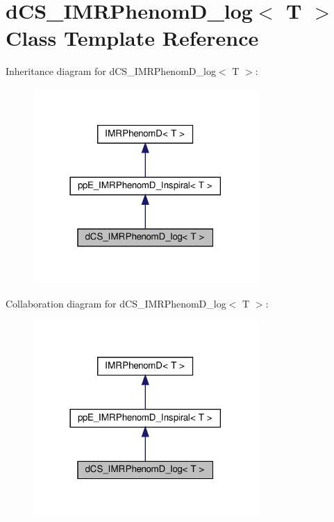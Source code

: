 \hypertarget{classdCS__IMRPhenomD__log}{}\section{d\+C\+S\+\_\+\+I\+M\+R\+Phenom\+D\+\_\+log$<$ T $>$ Class Template Reference}
\label{classdCS__IMRPhenomD__log}


Inheritance diagram for d\+C\+S\+\_\+\+I\+M\+R\+Phenom\+D\+\_\+log$<$ T $>$\+:\nopagebreak
\begin{figure}[H]
\begin{center}
\leavevmode
\includegraphics[width=242pt]{classdCS__IMRPhenomD__log__inherit__graph}
\end{center}
\end{figure}


Collaboration diagram for d\+C\+S\+\_\+\+I\+M\+R\+Phenom\+D\+\_\+log$<$ T $>$\+:\nopagebreak
\begin{figure}[H]
\begin{center}
\leavevmode
\includegraphics[width=242pt]{classdCS__IMRPhenomD__log__coll__graph}
\end{center}
\end{figure}
